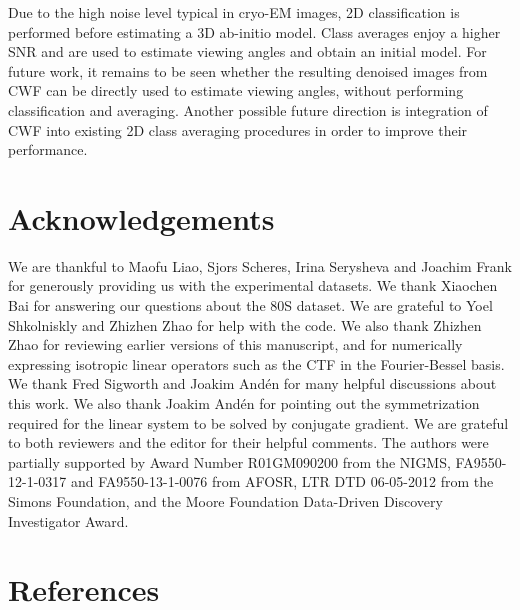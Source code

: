 \documentclass[review]{elsarticle}
\begin{document}
Due to the high noise level typical in cryo-EM images, 2D classification is performed before estimating a 3D ab-initio model. Class averages 
enjoy a higher SNR and are used to estimate viewing angles and obtain an initial model.
For future work, it remains to be seen whether the resulting denoised images from CWF can be directly used to estimate viewing angles,
without performing classification and averaging.
Another possible future direction is integration of CWF into existing 2D class averaging procedures in order to improve their performance.


\section{Acknowledgements}
We are thankful to Maofu Liao, Sjors Scheres, Irina Serysheva and Joachim Frank for generously
providing us with the experimental datasets. We thank Xiaochen Bai for answering our questions about the 80S dataset.
We are grateful to Yoel Shkolniskly and Zhizhen Zhao for help with the code. We also thank Zhizhen Zhao for reviewing earlier 
versions of this manuscript, and for numerically expressing isotropic linear operators such as the CTF in the Fourier-Bessel basis.
We thank Fred Sigworth and Joakim And\'en for many
helpful discussions about this work. We also thank Joakim And\'en for pointing out the symmetrization required for the linear system to be solved by conjugate gradient.   
We are grateful to both reviewers and the editor
for their helpful comments. The authors were partially supported by Award Number R01GM090200 from the NIGMS,
FA9550-12-1-0317 and FA9550-13-1-0076 from AFOSR, LTR DTD 06-05-2012 from the Simons
Foundation, and the Moore Foundation Data-Driven Discovery Investigator Award.

\clearpage
\section*{References}


\end{document}
